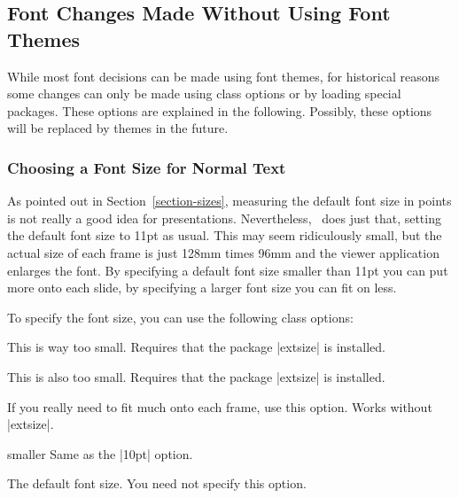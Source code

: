 \subsection{Font Changes Made Without Using Font Themes}

While most font decisions can be made using font themes, for
historical reasons some changes can only be made using class
options or by loading special packages. These options are explained in
the following. Possibly, these options will be replaced by themes in
the future.


\subsubsection{Choosing a Font Size for Normal Text}

As pointed out in Section~\ref{section-sizes}, measuring the default
font size in points is not really a good idea for
presentations. Nevertheless, \beamer\ does just that, setting the
default font size to 11pt as usual. This may seem ridiculously small, but
the actual size of each frame is just 128mm times 96mm and the viewer
application enlarges the font. By specifying a default font size
smaller than 11pt you can put more onto each slide, by specifying a
larger font size you can fit on less.

To specify the font size, you can use the following class options:

\begin{classoption}{8pt}
  This is way too small. Requires that the package |extsize|
  is installed.
\end{classoption}

\begin{classoption}{9pt}
  This is also too small. Requires that the package |extsize|
  is installed.
\end{classoption}

\begin{classoption}{10pt}
  If you really need to fit much onto each frame, use this
  option. Works without |extsize|.
\end{classoption}

\begin{classoption}{smaller}
  Same as the |10pt| option.
\end{classoption}

\begin{classoption}{11pt}
  The default font size. You need not specify this option.
\end{classoption}

